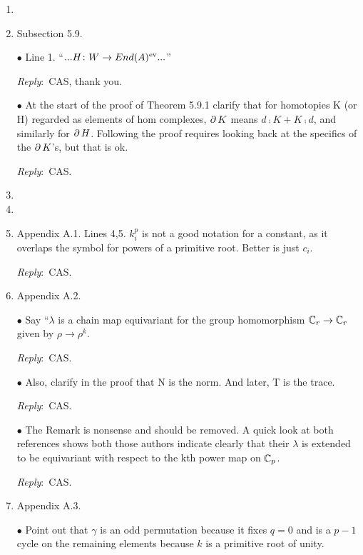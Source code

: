 \documentclass{amsart}
\newcommand{\ar}{\medskip\noindent\textit{Reply}:\ }
\def\subitem{\medskip\noindent$\bullet$ }
\begin{document}
\begin{enumerate}
	\ar We have added more explanations.
	It now reads:
	``Since $\AW(x \times y \times z) = v \ot \AW(y \times z)$ for any triple of simplices $x,y,z$ with $x = v$ a $0$-simplex or the image of one via a degeneracy maps $x = \mathrm{s}(v)$, we have ..."

	\item 

	\item Subsection 5.9.

	\subitem Line 1. “$... H \colon W \to End(A)^{\mathrm{ev}} ... $”

	\ar CAS, thank you.

	\subitem At the start of the proof of Theorem 5.9.1 clarify that for homotopies K (or H) regarded
	as elements of hom complexes, $\operatorname{\partial} K$ means $d \comp K + K \comp d$, and similarly for $\operatorname{\partial} H$.
	Following the proof requires looking back at the specifics of the $\operatorname{\partial} K$’s, but that is ok.

	\ar CAS.

	\item 

	\item 

	\item Appendix A.1. Lines 4,5. $k_i^p$ is not a good notation for a constant, as it overlaps the
	symbol for powers of a primitive root.
	Better is just $c_i$.

	\ar CAS.

	\item Appendix A.2.

	\subitem Say “$\lambda$ is a chain map equivariant for the group homomorphism $\mathbb{C}_r \to \mathbb{C}_r$
	given by $\rho \to \rho^k$.

	\ar CAS.

	\subitem Also, clarify in the proof that N is the norm. And later, T is the
	trace.

	\ar CAS.

	\subitem The Remark is nonsense and should be removed.
	A quick look at both references shows
	both those authors indicate clearly that their $\lambda$ is extended to be equivariant with respect
	to the kth power map on $\mathbb{C}_p$.

	\ar CAS.

	\item Appendix A.3.

	\subitem Point out that $\gamma$ is an odd permutation because it fixes $q = 0$ and is a
	$p-1$ cycle on the remaining elements because $k$ is a primitive root of unity.


\end{enumerate}
\end{document}
